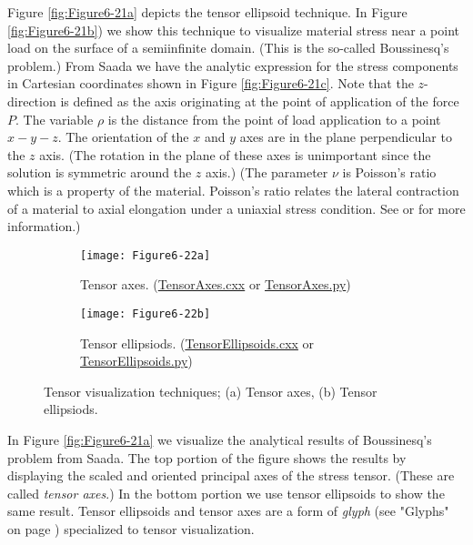 Figure \ref{fig:Figure6-21a} depicts the tensor ellipsoid technique. In Figure \ref{fig:Figure6-21b}) we show this technique to visualize material stress near a point load on the surface of a semiinfinite domain. (This is the so-called Boussinesq's problem.) From Saada \cite{Saada74} we have the analytic expression for the stress components in Cartesian coordinates shown in Figure \ref{fig:Figure6-21c}. Note that the $z$-direction is defined as the axis originating at the point of application of the force $P$. The variable $\rho$ is the distance from the point of load application to a point $x-y-z$. The orientation of the $x$ and $y$ axes are in the plane perpendicular to the $z$ axis. (The rotation in the plane of these axes is unimportant since the solution is symmetric around the $z$ axis.) (The parameter $\nu$ is Poisson's ratio which is a property of the material. Poisson's ratio relates the lateral contraction of a material to axial elongation under a uniaxial stress condition. See \cite{Saada74} or \cite{Timoshenko70} for more information.)

\begin{figure}[htb]
	\begin{subfigure}[h]{0.48\linewidth}
		\texttt{[image: Figure6-22a]}
		\caption{Tensor axes. (\href{https://lorensen.github.io/VTKExamples/site/Cxx/VisualizationAlgorithms/TensorAxes}{TensorAxes.cxx} or \href{https://lorensen.github.io/VTKExamples/site/Python/VisualizationAlgorithms/TensorAxes/}{TensorAxes.py})}
		\label{fig:Figure6-22a}
	\end{subfigure}
	\hfill
	\begin{subfigure}[h]{0.48\linewidth}
		\texttt{[image: Figure6-22b]}
		\caption{Tensor ellipsiods. (\href{https://lorensen.github.io/VTKExamples/site/Cxx/VisualizationAlgorithms/TensorEllipsoids}{TensorEllipsoids.cxx} or \href{https://lorensen.github.io/VTKExamples/site/Python/VisualizationAlgorithms/TensorEllipsoids/}{TensorEllipsoids.py})}
		\label{fig:Figure6-22b}
	\end{subfigure}
	\caption{Tensor visualization techniques; (a) Tensor axes, (b) Tensor ellipsiods.}\label{fig:Figure6-22}
\end{figure}

In Figure \ref{fig:Figure6-21a} we visualize the analytical results of Boussinesq's problem from Saada. The top portion of the figure shows the results by displaying the scaled and oriented principal axes of the stress tensor. (These are called \emph{tensor axes}.) In the bottom portion we use tensor ellipsoids to show the same result. Tensor ellipsoids and tensor axes are a form of \emph{glyph} (see "Glyphs" on page \pageref{subsec:glyphs} ) specialized to tensor visualization.

